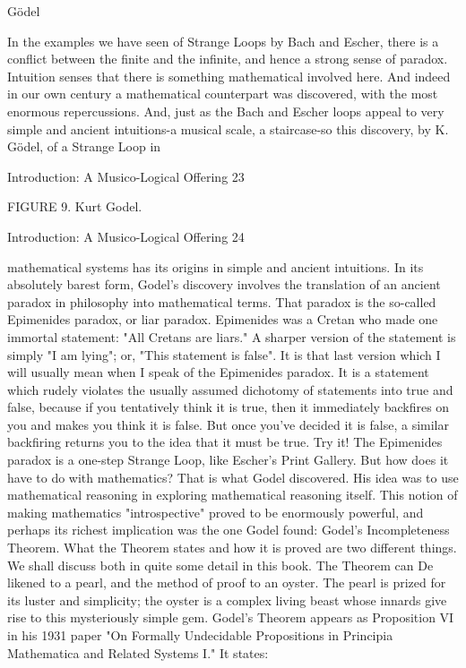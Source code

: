                                            Gödel

In the examples we have seen of Strange Loops by Bach and Escher, there is a conflict
between the finite and the infinite, and hence a strong sense of paradox. Intuition senses
that there is something mathematical involved here. And indeed in our own century a
mathematical counterpart was discovered, with the most enormous repercussions. And,
just as the Bach and Escher loops appeal to very simple and ancient intuitions-a musical
scale, a staircase-so this discovery, by K. Gödel, of a Strange Loop in




Introduction: A Musico-Logical Offering                                                   23

                               FIGURE 9. Kurt Godel.




Introduction: A Musico-Logical Offering                24

mathematical systems has its origins in simple and ancient intuitions. In its absolutely
barest form, Godel's discovery involves the translation of an ancient paradox in
philosophy into mathematical terms. That paradox is the so-called Epimenides paradox,
or liar paradox. Epimenides was a Cretan who made one immortal statement: "All
Cretans are liars." A sharper version of the statement is simply "I am lying"; or, "This
statement is false". It is that last version which I will usually mean when I speak of the
Epimenides paradox. It is a statement which rudely violates the usually assumed
dichotomy of statements into true and false, because if you tentatively think it is true,
then it immediately backfires on you and makes you think it is false. But once you've
decided it is false, a similar backfiring returns you to the idea that it must be true. Try it!
   The Epimenides paradox is a one-step Strange Loop, like Escher's Print Gallery. But
how does it have to do with mathematics? That is what Godel discovered. His idea was to
use mathematical reasoning in exploring mathematical reasoning itself. This notion of
making mathematics "introspective" proved to be enormously powerful, and perhaps its
richest implication was the one Godel found: Godel's Incompleteness Theorem. What the
Theorem states and how it is proved are two different things. We shall discuss both in
quite some detail in this book. The Theorem can De likened to a pearl, and the method of
proof to an oyster. The pearl is prized for its luster and simplicity; the oyster is a complex
living beast whose innards give rise to this mysteriously simple gem.
   Godel's Theorem appears as Proposition VI in his 1931 paper "On Formally
Undecidable Propositions in Principia Mathematica and Related Systems I." It states:

